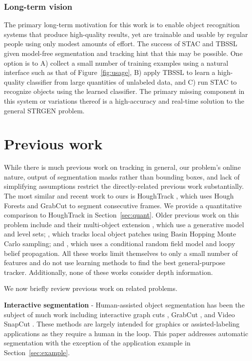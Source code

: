 \documentclass[graybox]{svmult}
\begin{document}
\subsubsection{Long-term vision}

The primary long-term motivation for this work is to enable object recognition systems that produce high-quality results, yet are trainable and usable by regular people using only modest amounts of effort. The success of STAC and TBSSL given model-free segmentation and tracking hint that this may be possible.  One option is to A) collect a small number of training examples using a natural interface such as that of Figure~\ref{fig:usage}, B) apply TBSSL to learn a high-quality classifier from large quantities of unlabeled data, and C) run STAC to recognize objects using the learned classifier.  The primary missing component in this system or variations thereof is a high-accuracy and real-time solution to the general STRGEN problem.

\section{Previous work}
\label{sec:prev_work}

While there is much previous work on tracking in general, our problem's online nature, output of segmentation masks rather than bounding boxes, and lack of simplifying assumptions restrict the directly-related previous work substantially.  The most similar and recent work to ours is HoughTrack \cite{godec2011a}, which uses Hough Forests and GrabCut to segment consecutive frames.  We provide a quantitative comparison to HoughTrack in Section~\ref{sec:quant}.  Older previous work on this problem include \cite{bibby2008a} and their multi-object extension \cite{bibby2010a}, which use a generative model and level sets; \cite{kwon2009a}, which tracks local object patches using Basin Hopping Monte Carlo sampling; and \cite{ren2007a}, which uses a conditional random field model and loopy belief propagation. All these works limit themselves to only a small number of features and do not use learning methods to find the best general-purpose tracker.  Additionally, none of these works consider depth information.

We now briefly review previous work on related problems.

\textbf{Interactive segmentation} - Human-assisted object segmentation has been the subject of much work including interactive graph cuts \cite{boykov2001a}, GrabCut \cite{rother2004a}, and Video SnapCut \cite{bai2009a}.  These methods are largely intended for graphics or assisted-labeling applications as they require a human in the loop.  This paper addresses automatic segmentation with the exception of the application example in Section~\ref{sec:example}.
\end{document}
